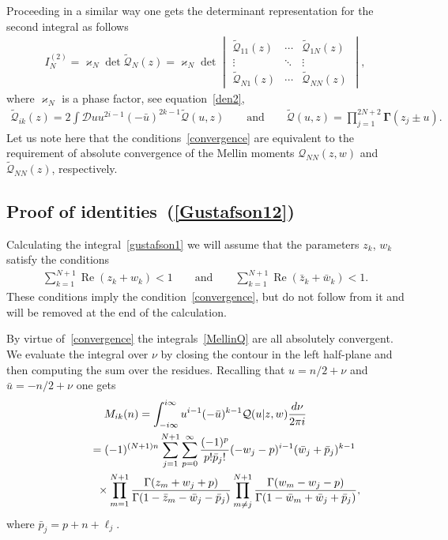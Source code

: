 \documentclass[11pt]{article}
\numberwithin{equation}{section}
\numberwithin{equation}{section}
\begin{document}
Proceeding in a similar way one gets the determinant representation for the second integral as follows
\begin{gather*}%
I_N^{(2)} =\varkappa_N \det \boldsymbol{\widetilde {\mathcal Q}}_N(z)=\varkappa_N \det \begin{vmatrix}
\widetilde{\mathcal{Q}}_{11}(z)&\cdots& \widetilde{\mathcal{Q}}_{1N}(z)\\
\vdots & \ddots &\vdots\\
\widetilde{\mathcal{Q}}_{N1}(z)&\cdots& \widetilde{\mathcal{Q}}_{NN}(z)
\end{vmatrix},
\end{gather*}
where $\varkappa_N$ is a phase factor, see equation~\eqref{den2},
\begin{gather*}
\widetilde {\mathcal Q}_{ik}(z)=2\int \mathcal{D}u u^{2i-1}(-\bar u)^{2k-1} \widetilde {\mathcal Q}(u,z) \qquad\text{and}
\qquad
\widetilde{ \mathcal Q}(u,z)=\prod_{j=1}^{2N+2} \boldsymbol\Gamma(z_j\pm u).
\end{gather*}
Let us note here that the conditions~\eqref{convergence} are equivalent to the requirement of absolute convergence of the Mellin moments $\mathcal Q_{NN}(z,w)$ and $\widetilde{\mathcal Q}_{NN}(z)$, respectively.

\subsection{Proof of identities~(\ref{Gustafson12})}\label{subsec:proof}

Calculating the integral~\eqref{gustafson1} we will assume that the parameters $z_k$, $w_k$ satisfy the conditions
\begin{gather}\label{zw-cond}
\sum_{k=1}^{N+1} \operatorname{Re}(z_k+w_k)<1 \qquad \text{and} \qquad \sum_{k=1}^{N+1} \operatorname{Re} (\bar z_k+\bar w_k)<1.
\end{gather}
These conditions imply the condition~\eqref{convergence}, but do not follow from it and will be removed at the end of the calculation.

By virtue of~\eqref{convergence} the integrals~\eqref{MellinQ} are all absolutely convergent. We evaluate the integral
over $\nu$ by closing the contour in the left half-plane and then computing the sum over the residues. Recalling that
$u=n/2+\nu$ and $\bar u=-n/2+\nu$ one gets
\begin{gather*}
M_{ik}(n) =\int^{{\rm i}\infty}_{-{\rm i}\infty} u^{i-1}(-\bar u)^{k-1} \mathcal Q(u|z,w) \frac{{\rm d}\nu}{2\pi {\rm i}}\notag\\
\hphantom{M_{ik}(n)}{} =
(-1)^{(N+1)n}\sum_{j=1}^{N+1} \sum_{p=0}^{\infty}\frac{(-1)^p}{p! \bar p_j!} (-w_{j}-p)^{i-1} (\bar w_{j} + \bar p_j)^{k-1}\notag\\
\hphantom{M_{ik}(n)=}{} \times
\prod_{m=1}^{N+1} \frac{\Gamma(z_m+w_{j}+p)}{\Gamma(1-\bar z_m-\bar w_{j}-\bar p_j)}
\prod_{m \neq j}^{N+1} \frac{\Gamma(w_m-w_{j}-p)}{\Gamma(1-\bar w_m+ \bar w_{j}+ \bar p_j)},%
\end{gather*}
where $\bar p_j = p+n+\ell_j$.
\end{document}
